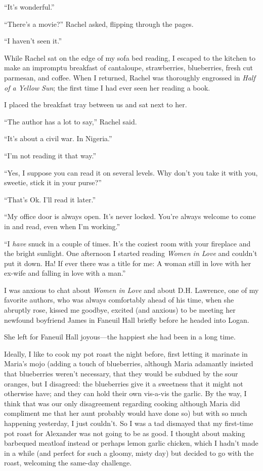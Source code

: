 ``It's wonderful.''

``There's a movie?'' Rachel asked, flipping through the pages.

``I haven't seen it.''

While Rachel sat on the edge of my sofa bed reading, I escaped to the
kitchen to make an impromptu breakfast of cantaloupe, strawberries,
blueberries, fresh cut parmesan, and coffee. When I returned, Rachel was
thoroughly engrossed in \emph{Half of a Yellow Sun}; the first time I
had ever seen her reading a book.

I placed the breakfast tray between us and sat next to her.

``The author has a lot to say,'' Rachel said.

``It's about a civil war. In Nigeria.''

``I'm not reading it that way.''

``Yes, I suppose you can read it on several levels. Why don't you take
it with you, sweetie, stick it in your purse?''

``That's Ok. I'll read it later.''

``My office door is always open. It's never locked. You're always
welcome to come in and read, even when I'm working.''

``I \emph{have} snuck in a couple of times. It's the coziest room with
your fireplace and the bright sunlight. One afternoon I started reading
\emph{Women in Love} and couldn't put it down. Ha! If ever there was a
title for me: A woman still in love with her ex-wife and falling in love
with a man.''

I was anxious to chat about \emph{Women in Love} and about D.H.
\linebreak Lawrence, one of my favorite authors, who was always comfortably ahead
of his time, when she abruptly rose, kissed me goodbye, excited (and
anxious) to be meeting her newfound boyfriend James in Faneuil Hall
briefly before he headed into Logan.

She left for Faneuil Hall joyous---the happiest she had been in a long
time.

Ideally, I like to cook my pot roast the night before, first letting it
marinate in Maria's mojo (adding a touch of blueberries, although Maria
adamantly insisted that blueberries weren't necessary, that they would
be subdued by the sour oranges, but I disagreed: the blueberries give it
a sweetness that it might not otherwise have; and they can hold their
own vis-a-vis the garlic. By the way, I think that was our only
disagreement regarding cooking although Maria did compliment me that her
aunt probably would have done so) but with so much happening yesterday,
I just couldn't. So I was a tad dismayed that my first-time pot roast
for Alexander was not going to be as good. I thought about making
barbequed meatloaf instead or perhaps lemon garlic chicken, which I
hadn't made in a while (and perfect for such a gloomy, misty day) but
decided to go with the roast, welcoming the same-day challenge.

